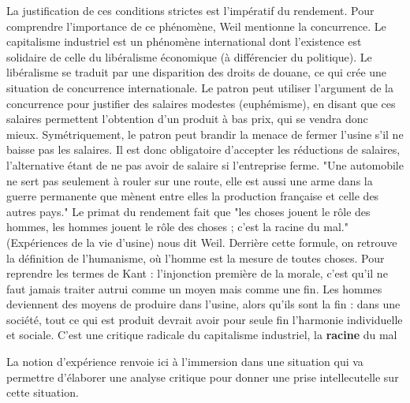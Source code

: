 \documentclass[a4paper,12pt]{book}
\begin{document}
\par La justification de ces conditions strictes est l'impératif du rendement. Pour comprendre l'importance de ce phénomène, Weil mentionne la concurrence. Le capitalisme industriel est un phénomène international dont l'existence est solidaire de celle du libéralisme économique (à différencier du politique). Le libéralisme se traduit par une disparition des droits de douane, ce qui crée une situation de concurrence internationale. Le patron peut utiliser l'argument de la concurrence pour justifier des salaires modestes (euphémisme), en disant que ces salaires permettent l'obtention d'un produit à bas prix, qui se vendra donc mieux. Symétriquement, le patron peut brandir la menace de fermer l'usine s'il ne baisse pas les salaires. Il est donc obligatoire d'accepter les réductions de salaires, l'alternative étant de ne pas avoir de salaire si l'entreprise ferme. "Une automobile ne sert pas seulement à rouler sur une route, elle est aussi une arme dans la guerre permanente que mènent entre elles la production française et celle des autres pays." Le primat du rendement fait que "les choses jouent le rôle des hommes, les hommes jouent le rôle des choses ; c'est la racine du mal." (Expériences de la vie d'usine) nous dit Weil. Derrière cette formule, on retrouve la définition de l'humanisme, où l'homme est la mesure de toutes choses. Pour reprendre les termes de Kant : l'injonction première de la morale, c'est qu'il ne faut jamais traiter autrui comme un moyen mais comme une fin. Les hommes deviennent des moyens de produire dans l'usine, alors qu'ils sont la fin : dans une société, tout ce qui est produit devrait avoir pour seule fin l'harmonie individuelle et sociale. C'est une critique radicale du capitalisme industriel, la \textbf{racine} du mal
\par La notion d'expérience renvoie ici à l'immersion dans une situation qui va permettre d'élaborer une analyse critique pour donner une prise intellecutelle sur cette situation.
\end{document}
